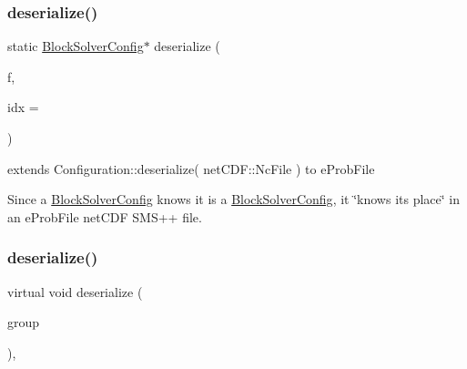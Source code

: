 \subsubsection{\texorpdfstring{deserialize()}{deserialize()}\hspace{0.1cm}{\footnotesize\ttfamily [1/2]}}
{\footnotesize\ttfamily static \mbox{\hyperlink{class_s_m_spp__di__unipi__it_1_1_block_solver_config}{Block\+Solver\+Config}}$\ast$ deserialize (\begin{DoxyParamCaption}\item[{net\+C\+D\+F\+::\+Nc\+File \&\&}]{f,  }\item[{const unsigned int}]{idx = {} }\end{DoxyParamCaption})\hspace{0.3cm}{\ttfamily [static]}}



extends Configuration\+::deserialize( net\+C\+D\+F\+::\+Nc\+File ) to e\+Prob\+File 

Since a \mbox{\hyperlink{class_s_m_spp__di__unipi__it_1_1_block_solver_config}{Block\+Solver\+Config}} knows it is a \mbox{\hyperlink{class_s_m_spp__di__unipi__it_1_1_block_solver_config}{Block\+Solver\+Config}}, it \char`\"{}knows its
place\char`\"{} in an e\+Prob\+File net\+C\+DF S\+M\+S++ file. \mbox{\label{class_s_m_spp__di__unipi__it_1_1_block_solver_config_a828ece608e8a4a497f43d3d6bb75af40}} 
\subsubsection{\texorpdfstring{deserialize()}{deserialize()}\hspace{0.1cm}{\footnotesize\ttfamily [2/2]}}
{\footnotesize\ttfamily virtual void deserialize (\begin{DoxyParamCaption}\item[{net\+C\+D\+F\+::\+Nc\+Group \&\&}]{group }\end{DoxyParamCaption})\hspace{0.3cm}{\ttfamily [override]}, {\ttfamily [virtual]}}




